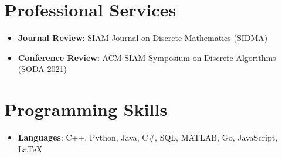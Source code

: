 \documentclass[letterpaper,11pt]{article}
\newcommand{\resumeItem}[2]{
  \item\small{
    \textbf{#1}{: #2 \vspace{-2pt}}
  }
}
\newcommand{\resumeSubItem}[2]{\resumeItem{#1}{#2}\vspace{-4pt}}
\newcommand{\resumeSubHeadingListStart}{\begin{itemize}[leftmargin=*]}
\newcommand{\resumeSubHeadingListEnd}{\end{itemize}}
\begin{document}
\section{Professional Services}
  \resumeSubHeadingListStart
    \resumeSubItem{Journal Review}{SIAM Journal on Discrete Mathematics (SIDMA)}
    \resumeSubItem{Conference Review}{ACM-SIAM Symposium on Discrete Algorithms (SODA 2021)}
  \resumeSubHeadingListEnd

\section{Programming Skills}
  \resumeSubHeadingListStart
    \resumeSubItem{Languages}
      {C++, Python, Java, C\#, SQL, MATLAB, Go, JavaScript, \LaTeX} \\
  \resumeSubHeadingListEnd


\end{document}
